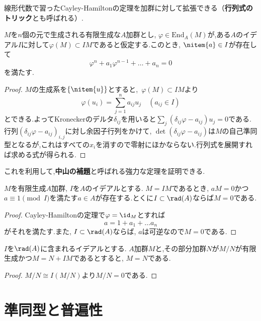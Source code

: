線形代数で習ったCayley-Hamiltonの定理を加群に対して拡張できる（\textbf{行列式のトリック}とも呼ばれる）.
\begin{thm}
	\label{thm:Cayley-Hamilton}
	$M$を$n$個の元で生成される有限生成な$A$加群とし, $\varphi\in\text{End}_A(M)$が,ある$A$のイデアル$I$に対して$\varphi(M)\subset IM$であると仮定する.このとき, $\nitem{a}\in I$が存在して
	\[\varphi^n+a_1\varphi^{n-1}+\dots+a_n=0\]
	を満たす.
\end{thm}
\begin{proof}
	$M$の生成系を$\{\nitem{u}\}$とすると,~$\varphi(M)\subset IM$より
	\[\varphi(u_i)=\sum_{j=1}^n a_{ij}u_j\quad(a_{ij}\in I)\]
	とできる.よってKroneckerのデルタ$\delta_{ij}$を用いると$\sum_j(\delta_{ij}\varphi-a_{ij})u_j=0$である.行列$(\delta_{ij}\varphi-a_{ij})_{i,j}$に対し余因子行列をかけて, $\det(\delta_{ij}\varphi-a_{ij})$は$M$の自己準同型となるが,これはすべての$x_i$を消すので零射にほかならない.行列式を展開すれば求める式が得られる.
\end{proof}

これを利用して,\textbf{中山の補題}と呼ばれる強力な定理を証明できる.	

\begin{thm}[中山の補題]\label{thm:NAK}
	$M$を有限生成$A$加群, $I$を$A$のイデアルとする. $M=IM$であるとき, $aM=0$かつ$a\equiv1\pmod{I}$を満たす$a\in A$が存在する.とくに$I\subset\rad(A)$ならば$M=0$である.
\end{thm}

\begin{proof}
	Cayley-Hamiltonの定理で$\varphi=\id_{M}$とすれば
	\[a=1+a_1+\dots a_n\]
	がそれを満たす.また, $I\subset\rad(A)$ならば, $a$は可逆なので$M=0$である.
\end{proof}

\begin{cor}\label{cor:NAK}
	$I$を$\rad(A)$に含まれるイデアルとする. $A$加群$M$と,その部分加群$N$が$M/N$が有限生成かつ$M=N+IM$であるとすると, $M=N$である.
\end{cor}

\begin{proof}
	$M/N\cong I(M/N)$より$M/N=0$である.
\end{proof}

\section{準同型と普遍性}

